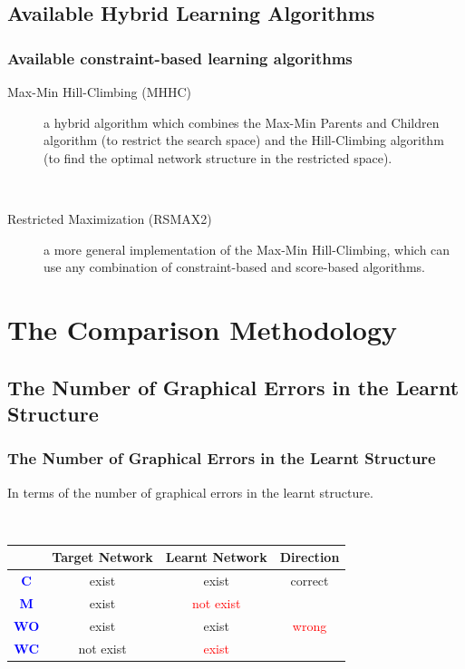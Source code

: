 \documentclass{beamer}
\begin{document}
\subsection{Available Hybrid Learning Algorithms}
\begin{frame}
\frametitle{Available constraint-based learning algorithms}
{\scriptsize{}
\begin{description}
\item[Max-Min Hill-Climbing (MHHC)] a hybrid algorithm which combines the Max-Min Parents and Children algorithm (to restrict the search space) and the Hill-Climbing algorithm (to find the optimal network structure in the restricted space).

{}\

\item[Restricted Maximization (RSMAX2)] a more general implementation of the Max-Min Hill-Climbing, which can use any combination of constraint-based and score-based algorithms.
\end{description}
}
\end{frame}



\section{The Comparison Methodology}
\subsection{The Number of Graphical Errors in the Learnt Structure}
\begin{frame}
\frametitle{The Number of Graphical Errors in the Learnt Structure}
{\scriptsize{}

In terms of the number of graphical errors in the learnt structure.

{}\
	
\begin{center}
\begin{tabular}{c|c|c|c}
\hline 
 & \textbf{Target Network} & \textbf{Learnt Network} & \textbf{Direction}\tabularnewline
\hline 
\textbf{\textcolor{blue}{C}} & exist & exist & correct\tabularnewline
\textbf{\textcolor{blue}{M}} & exist & \textcolor{red}{not exist} & \tabularnewline
\textbf{\textcolor{blue}{WO}} & exist & exist & \textcolor{red}{wrong}\tabularnewline
\textbf{\textcolor{blue}{WC}} & not exist & \textcolor{red}{exist} & \tabularnewline
\hline 
\end{tabular}
\end{center}
}
\end{frame}
\end{document}

